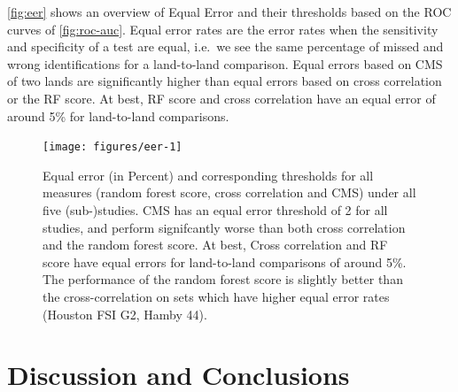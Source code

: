 \documentclass[doubleblind]{elsarticle}\usepackage[]{graphicx}\usepackage[]{color}
\newenvironment{knitrout}{}{} %
\begin{document}
\autoref{fig:eer} shows an overview of Equal Error and their thresholds based on the ROC curves of \autoref{fig:roc-auc}. Equal error rates are the error rates when the sensitivity and specificity of a test are equal, i.e.\ we see the same percentage of missed and wrong identifications for a land-to-land comparison. Equal errors based on CMS of two lands are significantly higher than equal errors based on cross correlation or the RF score. At best, RF score and cross correlation have an equal error of around 5\% for land-to-land comparisons. 



\begin{knitrout}
\color{fgcolor}\begin{figure}

{\centering \texttt{[image: figures/eer-1]} 

}

\caption[Equal error (in Percent)  and corresponding thresholds for all measures (random forest score, cross correlation and CMS) under all five (sub-)studies]{Equal error (in Percent)  and corresponding thresholds for all measures (random forest score, cross correlation and CMS) under all five (sub-)studies. CMS has an equal error threshold of 2 for all studies, and perform signifcantly worse than both cross correlation and the random forest score. At best, Cross correlation and RF score have equal errors for land-to-land comparisons of around 5\%. The performance of the random forest score is slightly better than the cross-correlation on sets which have higher equal error rates (Houston FSI G2, Hamby 44).}\label{fig:eer}
\end{figure}


\end{knitrout}


\section{Discussion and Conclusions}
\end{document}
